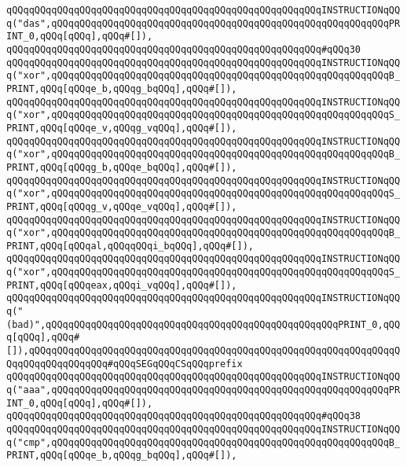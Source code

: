 \verb|qQQqqQQqqQQqqQQqqQQqqQQqqQQqqQQqqQQqqQQqqQQqqQQqqQQqqQQqINSTRUCTIONqQQq("das",qQQqqQQqqQQqqQQqqQQqqQQqqQQqqQQqqQQqqQQqqQQqqQQqqQQqqQQqqQQqPRINT_0,qQQq[qQQq],qQQq#[]),|\newline
\verb|qQQqqQQqqQQqqQQqqQQqqQQqqQQqqQQqqQQqqQQqqQQqqQQqqQQqqQQq#qQQq30|\newline
\verb|qQQqqQQqqQQqqQQqqQQqqQQqqQQqqQQqqQQqqQQqqQQqqQQqqQQqqQQqINSTRUCTIONqQQq("xor",qQQqqQQqqQQqqQQqqQQqqQQqqQQqqQQqqQQqqQQqqQQqqQQqqQQqqQQqqQQqB_PRINT,qQQq[qQQqe_b,qQQqg_bqQQq],qQQq#[]),|\newline
\verb|qQQqqQQqqQQqqQQqqQQqqQQqqQQqqQQqqQQqqQQqqQQqqQQqqQQqqQQqINSTRUCTIONqQQq("xor",qQQqqQQqqQQqqQQqqQQqqQQqqQQqqQQqqQQqqQQqqQQqqQQqqQQqqQQqqQQqS_PRINT,qQQq[qQQqe_v,qQQqg_vqQQq],qQQq#[]),|\newline
\verb|qQQqqQQqqQQqqQQqqQQqqQQqqQQqqQQqqQQqqQQqqQQqqQQqqQQqqQQqINSTRUCTIONqQQq("xor",qQQqqQQqqQQqqQQqqQQqqQQqqQQqqQQqqQQqqQQqqQQqqQQqqQQqqQQqqQQqB_PRINT,qQQq[qQQqg_b,qQQqe_bqQQq],qQQq#[]),|\newline
\verb|qQQqqQQqqQQqqQQqqQQqqQQqqQQqqQQqqQQqqQQqqQQqqQQqqQQqqQQqINSTRUCTIONqQQq("xor",qQQqqQQqqQQqqQQqqQQqqQQqqQQqqQQqqQQqqQQqqQQqqQQqqQQqqQQqqQQqS_PRINT,qQQq[qQQqg_v,qQQqe_vqQQq],qQQq#[]),|\newline
\verb|qQQqqQQqqQQqqQQqqQQqqQQqqQQqqQQqqQQqqQQqqQQqqQQqqQQqqQQqINSTRUCTIONqQQq("xor",qQQqqQQqqQQqqQQqqQQqqQQqqQQqqQQqqQQqqQQqqQQqqQQqqQQqqQQqqQQqB_PRINT,qQQq[qQQqal,qQQqqQQqi_bqQQq],qQQq#[]),|\newline
\verb|qQQqqQQqqQQqqQQqqQQqqQQqqQQqqQQqqQQqqQQqqQQqqQQqqQQqqQQqINSTRUCTIONqQQq("xor",qQQqqQQqqQQqqQQqqQQqqQQqqQQqqQQqqQQqqQQqqQQqqQQqqQQqqQQqqQQqS_PRINT,qQQq[qQQqeax,qQQqi_vqQQq],qQQq#[]),|\newline
\verb|qQQqqQQqqQQqqQQqqQQqqQQqqQQqqQQqqQQqqQQqqQQqqQQqqQQqqQQqINSTRUCTIONqQQq("(bad)",qQQqqQQqqQQqqQQqqQQqqQQqqQQqqQQqqQQqqQQqqQQqqQQqqQQqPRINT_0,qQQq[qQQq],qQQq#[]),qQQqqQQqqQQqqQQqqQQqqQQqqQQqqQQqqQQqqQQqqQQqqQQqqQQqqQQqqQQqqQQqqQQqqQQqqQQqqQQqqQQq#qQQqSEGqQQqCSqQQqprefix|\newline
\verb|qQQqqQQqqQQqqQQqqQQqqQQqqQQqqQQqqQQqqQQqqQQqqQQqqQQqqQQqINSTRUCTIONqQQq("aaa",qQQqqQQqqQQqqQQqqQQqqQQqqQQqqQQqqQQqqQQqqQQqqQQqqQQqqQQqqQQqPRINT_0,qQQq[qQQq],qQQq#[]),|\newline
\verb|qQQqqQQqqQQqqQQqqQQqqQQqqQQqqQQqqQQqqQQqqQQqqQQqqQQqqQQq#qQQq38|\newline
\verb|qQQqqQQqqQQqqQQqqQQqqQQqqQQqqQQqqQQqqQQqqQQqqQQqqQQqqQQqINSTRUCTIONqQQq("cmp",qQQqqQQqqQQqqQQqqQQqqQQqqQQqqQQqqQQqqQQqqQQqqQQqqQQqqQQqqQQqB_PRINT,qQQq[qQQqe_b,qQQqg_bqQQq],qQQq#[]),|\newline
